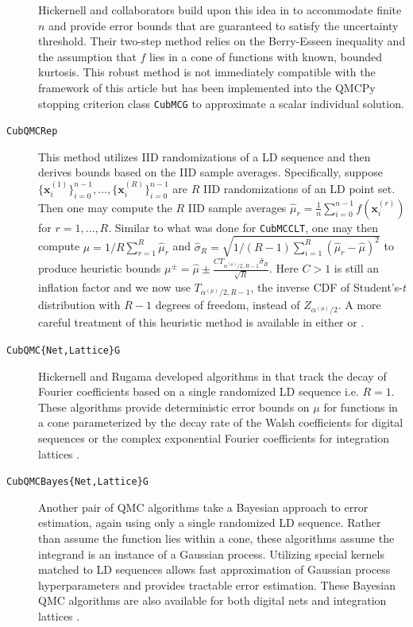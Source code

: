 \documentclass[graybox]{svmult}
\begin{document}
\begin{description}
    Hickernell and collaborators build upon this idea in \cite{cubmcg} to accommodate  finite $n$ and provide error bounds that are guaranteed to satisfy the uncertainty threshold. Their two-step method relies on the Berry-Esseen inequality and the assumption that $f$ lies in a cone of functions with known, bounded kurtosis. This robust method is not immediately compatible with the framework of this article but has been implemented into the QMCPy stopping criterion class \texttt{CubMCG} to approximate a scalar individual solution.
    \item[\texttt{CubQMCRep}] This method utilizes IID randomizations of a LD sequence and then derives bounds based on the IID sample averages. Specifically, suppose $\{\boldsymbol{x}_i^{(1)}\}_{i=0}^{n-1},\dots,\{\boldsymbol{x}_i^{(R)}\}_{i=0}^{n-1}$ are $R$ IID randomizations of an LD point set. Then one may compute the $R$ IID sample averages $\hat{\mu}_r = \frac{1}{n} \sum_{i=0}^{n-1} f(\boldsymbol{x}_i^{(r)})$ for $r = 1,\dots,R$. Similar to what was done for \texttt{CubMCCLT}, one may then compute $\hat{\mu} = 1/R \sum_{r=1}^R \hat{\mu}_r$ and $\hat{\sigma}_R = \sqrt{1/(R-1)\sum_{i=1}^R(\hat{\mu}_r - \hat{\mu})^2}$ to produce heuristic bounds $\mu^\pm = \hat{\mu} \pm \frac{C T_{\alpha^{(\mu)}/2,R-1} \hat{\sigma}_R}{\sqrt{R}}$. Here $C>1$ is still an inflation factor and we now use $T_{\alpha^{(\mu)}/2,R-1}$, the inverse CDF of Student's-$t$ distribution with $R-1$ degrees of freedom, instead of $Z_{\alpha^{(\mu)}/2}$.
    A more careful treatment of this heuristic method is available in either \cite[Chapter 17]{mcbook} or \cite{qmc4pde}. 
    \item[\texttt{CubQMC\{Net,Lattice\}G}] Hickernell and Rugama developed algorithms in \cite{adaptive_qmc} that track the decay of Fourier coefficients based on a single randomized LD sequence i.e. $R=1$. These algorithms provide deterministic error bounds on $\mu$ for functions in a cone parameterized by the decay rate of the Walsh coefficients for digital sequences \cite{cubqmcsobol} or the complex exponential Fourier coefficients for integration lattices \cite{cubqmclattice}. 
    \item[\texttt{CubQMCBayes\{Net,Lattice\}G}] Another pair of QMC algorithms take a Bayesian approach to error estimation, again using only a single randomized LD sequence. Rather than assume the function lies within a cone, these algorithms assume the integrand is an instance of a Gaussian process. Utilizing special kernels matched to LD sequences allows fast approximation of Gaussian process hyperparameters and provides tractable error estimation. These Bayesian QMC algorithms are also available for both digital nets \cite{cubqmcbayes_thesis} and integration lattices  \cite{cubqmcbayeslattice}. 
\end{description}
\end{document}
